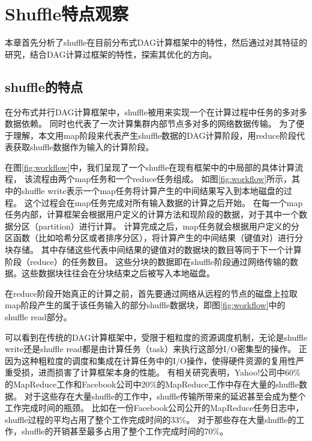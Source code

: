 
\chapter{Shuffle特点观察}
\label{chap:observations}

本章首先分析了shuffle在目前分布式DAG计算框架中的特性，然后通过对其特征的研究，结合DAG计算过框架的特性，探索其优化的方向。

\section{shuffle的特点}
在分布式并行DAG计算框架中，shuffle被用来实现一个在计算过程中任务的多对多数据依赖。
同时也代表了一次计算集群内部节点多对多的网络数据传输。
为了便于理解，本文用map阶段来代表产生shuffle数据的DAG计算阶段，用reduce阶段代表获取shuffle数据作为输入的计算阶段。

在图\ref{fig:workflow}中，我们呈现了一个shuffle在现有框架中的中局部的具体计算流程， 该流程由两个map任务和一个reduce任务组成。
如图\ref{fig:workflow}所示，其中的shuffle write表示一个map任务将计算产生的中间结果写入到本地磁盘的过程。
这个过程会在map任务完成对所有输入数据的计算之后开始。
在每一个map任务内部，计算框架会根据用户定义的计算方法和现阶段的数据，对于其中一个数据分区（partition）进行计算。
计算完成之后，map任务就会根据用户定义的分区函数（比如哈希分区或者排序分区），将计算产生的中间结果（键值对）进行分块存储。
其中存储这些代表中间结果的键值对的数据块的数目等同于下一个计算阶段（reduce）的任务数目。
这些分块的数据即在shuffle阶段通过网络传输的数据。这些数据块往往会在分块结束之后被写入本地磁盘。

在reduce阶段开始真正的计算之前，首先要通过网络从远程的节点的磁盘上拉取map阶段产生的属于该任务输入的部分shuffle数据块，即图\ref{fig:workflow}中的shuffle read部分。

可以看到在传统的DAG计算框架中，受限于粗粒度的资源调度机制，无论是shuffle write还是shuffle read都是由计算任务（task）来执行这部分I/O密集型的操作。
正因为这种粗粒度的调度和集成在计算任务中的I/O操作，使得硬件资源的复用性严重受损，进而损害了计算框架本身的性能。
有相关研究表明，Yahoo!公司中60\%的MapReduce工作和Facebook公司中20\%的MapReduce工作中存在大量的shuffle数据\cite{shufflewatcher}。
对于这些存在大量shuffle的工作中，shuffle传输所带来的延迟甚至会成为整个工作完成时间的瓶颈。
比如在一份Facebook公司公开的MapReduce任务日志中，shuffle过程的平均占用了整个工作完成时间的33\%。
对于那些存在大量shuffle的工作，shuffle的开销甚至最多占用了整个工作完成时间的70\%。


